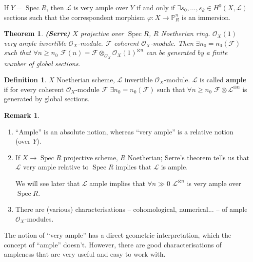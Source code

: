 \documentclass[12pt]{article}
\DeclareMathOperator{\Spec}{Spec}
\newtheorem*{theorem}{Theorem}
\theoremstyle{definition}
\newtheorem*{definition}{Definition}
\newtheorem*{remark}{Remark}
\begin{document}
If $Y=\Spec R$, then $\mathcal L$ is very ample over $Y$ if and only if $\exists s_0,\ldots,s_k\in H^0(X,\mathcal L)$ sections such that the correspondent morphism $\varphi:X\rightarrow\mathbb P_R^n$ is an immersion.

\begin{theorem}
\emph{\textbf{(Serre)}} $X$ projective over $\Spec R$, $R$ Noetherian ring. $\mathcal O_X(1)$ very ample invertible $\mathcal O_X$-module. $\mathcal F$ coherent $\mathcal O_X$-module. Then $\exists n_0=n_0(\mathcal F)$ such that $\forall n\geq n_0$ $\mathcal F(n)=\mathcal F\otimes_{\mathcal O_X}\mathcal O_X(1)^{\otimes n}$ can be generated by a finite number of global sections.
\end{theorem}

\begin{definition}
$X$ Noetherian scheme, $\mathcal L$ invertible $\mathcal O_X$-module. $\mathcal L$ is called \textbf{ample} if for every coherent $\mathcal O_X$-module $\mathcal F$ $\exists n_0=n_0(\mathcal F)$ such that $\forall n\geq n_0$ $\mathcal F\otimes\mathcal L^{\otimes n}$ is generated by global sections.
\end{definition}

\begin{remark}
\begin{enumerate}[label=\arabic*)]
\item ``Ample'' is an absolute notion, whereas ``very ample'' is a relative notion (over $Y$).

\item If $X\rightarrow\Spec R$ projective scheme, $R$ Noetherian; Serre's theorem tells us that $\mathcal L$ very ample relative to $\Spec R$ implies that $\mathcal L$ is ample.

We will see later that $\mathcal L$ ample implies that $\forall n\gg0$ $\mathcal L^{\otimes n}$ is very ample over $\Spec R$.

\item There are (various) characterisations -- cohomological, numerical... -- of ample $\mathcal O_X$-modules.
\end{enumerate}
\end{remark}

The notion of ``very ample'' has a direct geometric interpretation, which the concept of ``ample'' doesn't. However, there are good characterisations of ampleness that are very useful and easy to work with.
\end{document}
